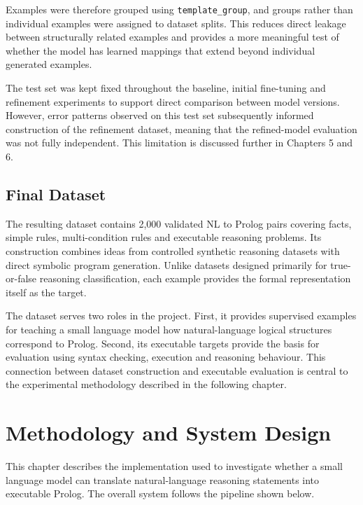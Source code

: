 \documentclass[11pt]{article} %
\theoremstyle{plain}
\theoremstyle{definition}
\begin{document}
Examples were therefore grouped using \texttt{template\_group}, and groups
rather than individual examples were assigned to dataset splits. This reduces
direct leakage between structurally related examples and provides a more
meaningful test of whether the model has learned mappings that extend beyond
individual generated examples.

The test set was kept fixed throughout the baseline, initial fine-tuning
and refinement experiments to support direct comparison between model
versions. However, error patterns observed on this test set subsequently
informed construction of the refinement dataset, meaning that the
refined-model evaluation was not fully independent. This limitation is
discussed further in Chapters 5 and 6.

\subsection{Final Dataset}

The resulting dataset contains 2,000 validated NL to Prolog pairs covering facts,
simple rules, multi-condition rules and executable reasoning problems. Its
construction combines ideas from controlled synthetic reasoning datasets with
direct symbolic program generation. Unlike datasets designed primarily for
true-or-false reasoning classification, each example provides the formal
representation itself as the target.

The dataset serves two roles in the project. First, it provides supervised
examples for teaching a small language model how natural-language logical
structures correspond to Prolog. Second, its executable targets provide the
basis for evaluation using syntax checking, execution and reasoning behaviour.
This connection between dataset construction and executable evaluation is
central to the experimental methodology described in the following chapter.

\clearpage
\section{Methodology and System Design}

This chapter describes the implementation used to investigate whether a small
language model can translate natural-language reasoning statements into
executable Prolog. The overall system follows the pipeline shown below.
\end{document}
